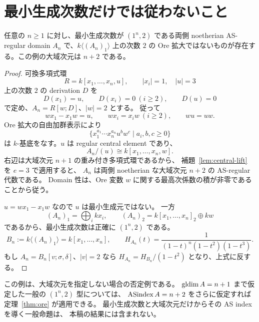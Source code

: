 \section{最小生成次数だけでは従わないこと}\label{sec:counterexample}

\begin{proposition}\label{prop:counterexample}
任意の \(n\ge1\) に対し、最小生成次数が \((1^n,2)\) である両側 noetherian
AS-regular domain \(A_n\) で、\(k\langle(A_n)_1\rangle\) 上の次数 \(2\) の
Ore 拡大ではないものが存在する。この例の大域次元は \(n+2\) である。
\end{proposition}

\begin{proof}
可換多項式環
\[
R=k[x_1,\ldots,x_n,u],\qquad |x_i|=1,\quad |u|=3
\]
上の次数 \(2\) の derivation \(D\) を
\[
D(x_1)=u,\qquad D(x_i)=0\ (i\ge2),\qquad D(u)=0
\]
で定め、\(A_n=R[w;D]\)、\(|w|=2\) とする。
従って
\[
wx_1-x_1w=u,\qquad wx_i=x_iw\ (i\ge2),\qquad wu=uw.
\]
Ore 拡大の自由加群表示により
\[
\{x_1^{a_1}\cdots x_n^{a_n}u^bw^c\mid a_i,b,c\ge0\}
\]
は \(k\)-基底をなす。\(u\) は regular central element であり、
\[
A_n/(u)\cong k[x_1,\ldots,x_n,w].
\]
右辺は大域次元 \(n+1\) の重み付き多項式環であるから、
補題~\ref{lem:central-lift} を \(e=3\) で適用すると、
\(A_n\) は両側 noetherian な大域次元 \(n+2\) の AS-regular 代数である。
Domain 性は、Ore 変数 \(w\) に関する最高次係数の積が非零であることから従う。

\(u=wx_1-x_1w\) なので \(u\) は最小生成元ではない。
一方
\[
(A_n)_1=\bigoplus_i kx_i,\qquad
(A_n)_2=k[x_1,\ldots,x_n]_2\oplus kw
\]
であるから、最小生成次数は正確に \((1^n,2)\) である。
\[
B_n:=k\langle(A_n)_1\rangle=k[x_1,\ldots,x_n],\qquad
H_{A_n}(t)=\frac1{(1-t)^n(1-t^2)(1-t^3)}.
\]
もし \(A_n=B_n[v;\sigma,\delta]\)、\(|v|=2\) なら
\(H_{A_n}=H_{B_n}/(1-t^2)\) となり、上式に反する。
\end{proof}

この例は、大域次元を指定しない場合の否定例である。
\(\operatorname{gldim} A=n+1\) まで仮定した一般の \((1^n,2)\) 型については、
\(\operatorname{ASindex} A=n+2\) をさらに仮定すれば定理~\ref{thm:ore} が適用できる。
最小生成次数と大域次元だけからその AS index を導く一般命題は、
本稿の結果には含まれない。
